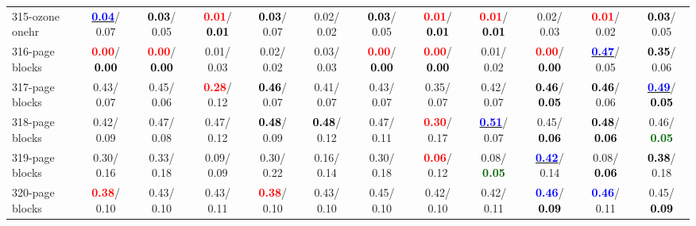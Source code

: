 \begin{table}[h]
\begin{center}
{\begin{tabular}{lc|c|c|c|c|c|c|c|c|c|c}
315-ozone onehr & \underline{\textcolor{blue}{\textbf{  0.04}}}/  0.07 & \textcolor{black}{\textbf{  0.03}}/  0.05 & \textcolor{red}{\textbf{  0.01}}/\textcolor{black}{\textbf{  0.01}} & \textcolor{black}{\textbf{  0.03}}/  0.07 &   0.02/  0.02 & \textcolor{black}{\textbf{  0.03}}/  0.05 & \textcolor{red}{\textbf{  0.01}}/\textcolor{black}{\textbf{  0.01}} & \textcolor{red}{\textbf{  0.01}}/\textcolor{black}{\textbf{  0.01}} &   0.02/  0.03 & \textcolor{red}{\textbf{  0.01}}/  0.02 & \textcolor{black}{\textbf{  0.03}}/  0.05 \\
316-page blocks & \textcolor{red}{\textbf{  0.00}}/\textcolor{black}{\textbf{  0.00}} & \textcolor{red}{\textbf{  0.00}}/\textcolor{black}{\textbf{  0.00}} &   0.01/  0.03 &   0.02/  0.02 &   0.03/  0.03 & \textcolor{red}{\textbf{  0.00}}/\textcolor{black}{\textbf{  0.00}} & \textcolor{red}{\textbf{  0.00}}/\textcolor{black}{\textbf{  0.00}} &   0.01/  0.02 & \textcolor{red}{\textbf{  0.00}}/\textcolor{black}{\textbf{  0.00}} & \underline{\textcolor{blue}{\textbf{  0.47}}}/  0.05 & \textcolor{black}{\textbf{  0.35}}/  0.06 \\ \hline
317-page blocks &   0.43/  0.07 &   0.45/  0.06 & \textcolor{red}{\textbf{  0.28}}/  0.12 & \textcolor{black}{\textbf{  0.46}}/  0.07 &   0.41/  0.07 &   0.43/  0.07 &   0.35/  0.07 &   0.42/  0.07 & \textcolor{black}{\textbf{  0.46}}/\textcolor{black}{\textbf{  0.05}} & \textcolor{black}{\textbf{  0.46}}/  0.06 & \underline{\textcolor{blue}{\textbf{  0.49}}}/\textcolor{black}{\textbf{  0.05}} \\
318-page blocks &   0.42/  0.09 &   0.47/  0.08 &   0.47/  0.12 & \textcolor{black}{\textbf{  0.48}}/  0.09 & \textcolor{black}{\textbf{  0.48}}/  0.12 &   0.47/  0.11 & \textcolor{red}{\textbf{  0.30}}/  0.17 & \underline{\textcolor{blue}{\textbf{  0.51}}}/  0.07 &   0.45/\textcolor{black}{\textbf{  0.06}} & \textcolor{black}{\textbf{  0.48}}/\textcolor{black}{\textbf{  0.06}} &   0.46/\textcolor{darkgreen}{\textbf{  0.05}} \\
319-page blocks &   0.30/  0.16 &   0.33/  0.18 &   0.09/  0.09 &   0.30/  0.22 &   0.16/  0.14 &   0.30/  0.18 & \textcolor{red}{\textbf{  0.06}}/  0.12 &   0.08/\textcolor{darkgreen}{\textbf{  0.05}} & \underline{\textcolor{blue}{\textbf{  0.42}}}/  0.14 &   0.08/\textcolor{black}{\textbf{  0.06}} & \textcolor{black}{\textbf{  0.38}}/  0.18 \\
320-page blocks & \textcolor{red}{\textbf{  0.38}}/  0.10 &   0.43/  0.10 &   0.43/  0.11 & \textcolor{red}{\textbf{  0.38}}/  0.10 &   0.43/  0.10 &   0.45/  0.10 &   0.42/  0.10 &   0.42/  0.11 & \textcolor{blue}{\textbf{  0.46}}/\textcolor{black}{\textbf{  0.09}} & \textcolor{blue}{\textbf{  0.46}}/  0.11 &   0.45/\textcolor{black}{\textbf{  0.09}} \\\end{tabular}}\label{stratsALCKappa9AllReduxHalfa}
\end{center}
\end{table}
